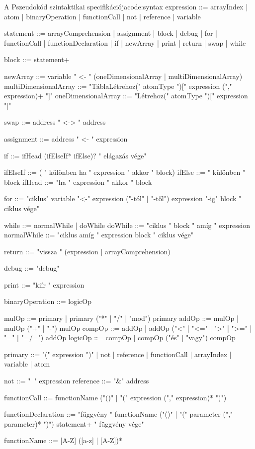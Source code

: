 \iffalse
\begin{code}{A Pszeudokód szintaktikai specifikációja}{code:syntax}
expression ::= arrayIndex | atom | binaryOperation | functionCall | not | reference | variable

statement ::= arrayComprehension | assignment | block | debug | for | functionCall | functionDeclaration | if | newArray | print | return | swap | while

block ::= statement+

newArray ::= variable " <- " (oneDimensionalArray | multiDimensionalArray)
multiDimensionalArray ::= "TáblaLétrehoz(" atomType ")[" expression ("," expression)+ "]"
oneDimensionalArray ::= "Létrehoz(" atomType ")[" expression "]"

swap ::= address " <-> " address

assignment ::= address " <- " expression

if ::= ifHead (ifElseIf* ifElse)? " elágazás vége"

ifElseIf ::= ( " különben ha " expression " akkor " block)
ifElse ::= " különben " block
ifHead ::= "ha " expression " akkor " block 

for ::= "ciklus" variable "<-" expression ("-tól" | "-től") expression "-ig" block " ciklus vége"

while ::= normalWhile | doWhile
doWhile ::= "ciklus " block " amíg " expression
normalWhile ::= "ciklus amíg " expression block " ciklus vége"

return ::= "vissza " (expression | arrayComprehension) 

debug ::= "debug"

print ::= "kiír " expression

binaryOperation ::= logicOp

mulOp ::= primary | primary ("*" | "/" | "mod") primary
addOp ::= mulOp | mulOp ("+" | "-") mulOp
compOp ::= addOp | addOp ("<" | "<=" | ">" | ">=" | "=" | "=/=") addOp
logicOp ::= compOp | compOp ("és" | "vagy") compOp

primary ::= "(" expression ")" | not | reference | functionCall | arrayIndex | variable | atom

not ::= "~" expression
reference ::= "&" address

functionCall ::= functionName ("()" | "(" expression ("," expression)* ")")

functionDeclaration ::= "függvény " functionName ("()" | "(" parameter ("," parameter)* ")") statement+ " függvény vége"

functionName ::= [A-Z] ([a-z] | [A-Z])*


\end{code}
